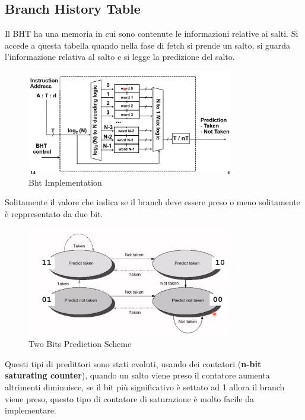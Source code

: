 \documentclass[12pt]{article}
\begin{document}
\subsection{Branch History Table}
Il BHT ha una memoria in cui sono contenute le informazioni relative ai salti. Si accede a questa tabella quando nella fase di fetch si prende un salto, si guarda l'informazione relativa al salto e si legge la predizione del salto.
\begin{figure}[H]
    \centering
    \includegraphics[width=0.8\textwidth]{bht-implementation.png}
    \caption{Bht Implementation}
    \label{fig:bht-implementation}
\end{figure}
Solitamente il valore che indica se il branch deve essere preso o meno solitamente \`e reppresentato da due bit.
\begin{figure}[H]
    \centering
    \includegraphics[width=0.8\textwidth]{two-bits-prediction-scheme.png}
    \caption{Two Bits Prediction Scheme}
    \label{fig:two-bits-prediction-scheme}
\end{figure}
Questi tipi di predittori sono stati evoluti, usando dei contatori (\textbf{n-bit saturating counter}), quando un salto viene preso il contatore aumenta altrimenti diminuisce, se il bit pi\`u significativo \`e settato ad 1 allora il branch viene preso, questo tipo di contatore di saturazione \`e molto facile da implementare.
\end{document}
